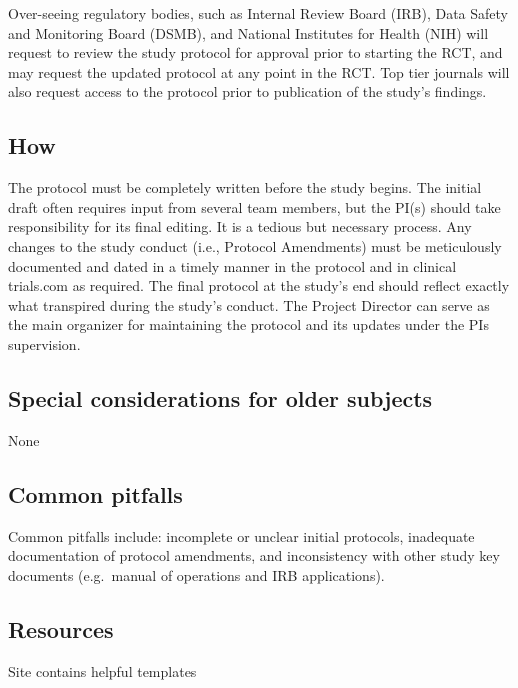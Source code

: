 \documentclass[]{book}
\theoremstyle{definition}
\theoremstyle{definition}
\theoremstyle{definition}
\theoremstyle{remark}
\begin{document}
Over-seeing regulatory bodies, such as Internal Review Board (IRB), Data
Safety and Monitoring Board (DSMB), and National Institutes for Health
(NIH) will request to review the study protocol for approval prior to
starting the RCT, and may request the updated protocol at any point in
the RCT. Top tier journals will also request access to the protocol
prior to publication of the study's findings.

\subsection{How}\label{how-11}

The protocol must be completely written before the study begins. The
initial draft often requires input from several team members, but the
PI(s) should take responsibility for its final editing. It is a tedious
but necessary process. Any changes to the study conduct (i.e., Protocol
Amendments) must be meticulously documented and dated in a timely manner
in the protocol and in clinical trials.com as required. The final
protocol at the study's end should reflect exactly what transpired
during the study's conduct. The Project Director can serve as the main
organizer for maintaining the protocol and its updates under the PIs
supervision.

\subsection{Special considerations for older
subjects}\label{special-considerations-for-older-subjects-7}

None

\subsection{Common pitfalls}\label{common-pitfalls-10}

Common pitfalls include: incomplete or unclear initial protocols,
inadequate documentation of protocol amendments, and inconsistency with
other study key documents (e.g.~manual of operations and IRB
applications).

\subsection{Resources}\label{resources-12}

Site contains helpful templates
\end{document}
